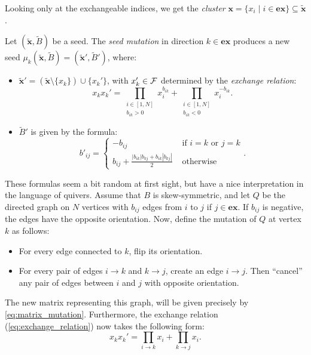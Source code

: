 \documentclass{article}
\newcommand{\ex}{\mathbf{ex}}
\newcommand{\bx}{\mathbf{x}}
\newcommand{\tbx}{\tilde{\bx}}
\newcommand{\tB}{\tilde{B}}
\begin{document}
Looking only at the exchangeable indices, we get the \emph{cluster} $\mathbf{x} = \{x_i
	\mid i \in \ex \} \subseteq \tilde{\mathbf{x}}$.
\begin{definition}
	Let $(\tilde{\mathbf{x}}, \tilde{B})$ be a seed.
	The \emph{seed mutation} in direction $k \in \ex$
	produces a new seed $\mu_k(\tilde{\mathbf{x}}, \tB) = (\tilde{\bx}', \tB')$, where:
	\begin{itemize}
		\item $\tbx' = (\tbx \setminus \{x_k\}) \cup \{x_k'\}$,
		      with $x_k' \in \mathcal{F}$ determined by the \emph{exchange relation}:
		      \begin{equation}
			      \label{eq:exchange_relation}
			      x_kx_k' = \prod_{\substack{i \in [1,N] \\ b_{ik} > 0}}x_i^{b_{ik}} + \prod_{\substack{i \in [1, N] \\ b_{ik} < 0}}x_i^{-b_{ik}}.
		      \end{equation}
		\item $\tB'$ is given by the formula:
		      \begin{equation}
			      \label{eq:matrix_mutation}
			      b'_{ij} =
			      \begin{cases}
				      -b_{ij}                                            & \text{ if } i=k \text{ or } j=k \\
				      b_{ij} + \frac{|b_{ik}|b_{kj} + b_{ik}|b_{kj}|}{2} & \text{ otherwise}
			      \end{cases}
			      .
		      \end{equation}
	\end{itemize}
\end{definition}

\begin{remark}
	These formulas seem a bit random at first sight,
	but have a nice interpretation in the language of quivers.
	Assume that $B$ is skew-symmetric,
	and let $Q$ be the directed graph on $N$ vertices with $b_{ij}$ edges
	from $i$ to $j$ if $j \in \ex$. If $b_{ij}$ is negative,
	the edges have the opposite orientation.
	Now, define the mutation of $Q$ at vertex $k$ as follows:
	\begin{itemize}
		\item For every edge connected to $k$, flip its orientation.
		\item For every pair of edges $i\to k$ and $k\to j$, create an edge $i \to j$. Then
		      ``cancel'' any pair of edges between $i$ and $j$ with opposite orientation.
	\end{itemize}
	The new matrix representing this graph, will be given precisely by \cref{eq:matrix_mutation}.
	Furthermore, the exchange relation (\ref{eq:exchange_relation}) now takes the following form:
	\begin{equation*}
		x_kx_k' = \prod_{i \to k}x_i + \prod_{k \to j}x_i.
	\end{equation*}
\end{remark}
\end{document}
